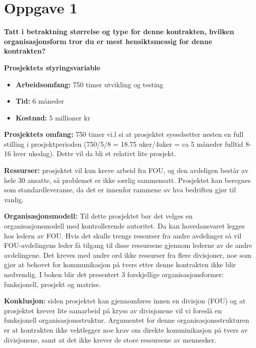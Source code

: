 \section*{Oppgave 1}

	{\bf Tatt i betraktning størrelse og type for denne kontrakten, hvilken organisasjonsform 
	tror du er mest hensiktsmessig for denne kontrakten?}

	{\bf Prosjektets styringsvariable}
		\begin{itemize}
			\item {\bf Arbeidsomfang:} 750 timer utvikling og testing
			\item {\bf Tid:} 6 måneder
			\item {\bf Kostnad:} 5 millioner kr
		\end{itemize}

		{\bf Prosjektets omfang:} 750 timer vi.l si at prosjektet sysselsetter nesten en full stilling i prosjektperioden
		(750/5/8 = 18.75 uker/4uker = ca 5 måneder fulltid 8-16 hver ukedag).
		Dette vil da bli et relativt lite prosjekt. 

		{\bf Ressurser:} prosjektet vil kun kreve arbeid fra FOU, og 
		den avdeligen består av hele 30 ansatte, så problemet er ikke særlig sammensatt.
		Prosjektet kan beregnes som standardleveranse, da det er innenfor rammene av hva bedriften 
		gjør til vanlig.

		{\bf Organisasjonsmodell:} Til dette prosjektet bør det velges en organisasjonsmodell med 
		kontrollerende autoritet. Da kan hovedansvaret legges hos ledern av FOU. Hvis det skulle 
		trengs ressurser fra andre avdelinger så vil FOU-avdelingens leder få tilgang til disse 
		ressursene gjennom lederne av de andre avdelingene. Det kreves med andre ord ikke ressurser
		fra flere divisjoner, noe som gjør at behovet for kommunikasjon på tvers etter denne kontrakten
		ikke blir nødvendig. 
		I boken blir det presentert 3 forskjellige organisasjonsformer: funksjonell, prosjekt og 
		matrise. 

		{\bf Konklusjon:} siden prosjektet kan gjennomføres innen en divisjon (FOU) og at prosjektet
		krever lite samarbeid på kryss av divisjonene vil vi foreslå en funksjonell organisasjonsstruktur.
		Argumentet for denne organisasjonsstrukturen er at kontrakten ikke vektlegger noe krav om 
		direkte komminikasjon på tvers av divisjonene, samt at det ikke krever de store ressursene
		av mennesker.
			